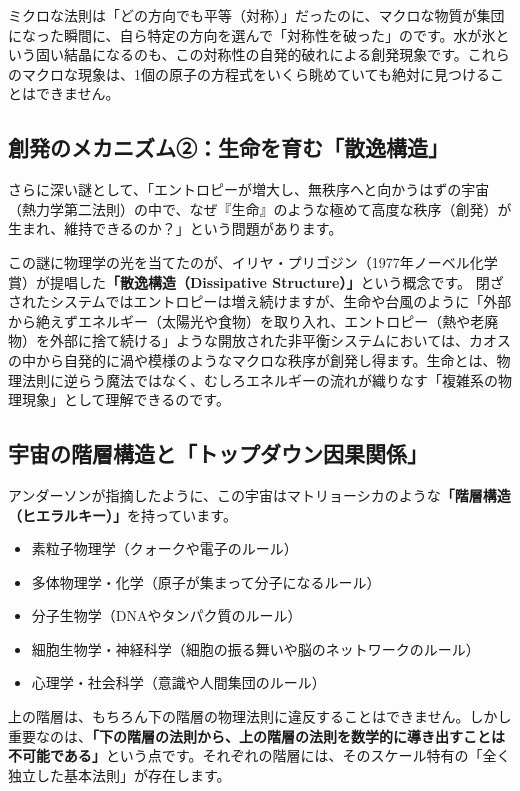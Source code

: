 ミクロな法則は「どの方向でも平等（対称）」だったのに、マクロな物質が集団になった瞬間に、自ら特定の方向を選んで「対称性を破った」のです。水が氷という固い結晶になるのも、この対称性の自発的破れによる創発現象です。これらのマクロな現象は、1個の原子の方程式をいくら眺めていても絶対に見つけることはできません。

\subsection{創発のメカニズム②：生命を育む「散逸構造」}

さらに深い謎として、「エントロピーが増大し、無秩序へと向かうはずの宇宙（熱力学第二法則）の中で、なぜ『生命』のような極めて高度な秩序（創発）が生まれ、維持できるのか？」という問題があります。

この謎に物理学の光を当てたのが、イリヤ・プリゴジン（1977年ノーベル化学賞）が提唱した\textbf{「散逸構造（Dissipative Structure）」}という概念です。 閉ざされたシステムではエントロピーは増え続けますが、生命や台風のように「外部から絶えずエネルギー（太陽光や食物）を取り入れ、エントロピー（熱や老廃物）を外部に捨て続ける」ような開放された非平衡システムにおいては、カオスの中から自発的に渦や模様のようなマクロな秩序が創発し得ます。生命とは、物理法則に逆らう魔法ではなく、むしろエネルギーの流れが織りなす「複雑系の物理現象」として理解できるのです。

\subsection{宇宙の階層構造と「トップダウン因果関係」}

アンダーソンが指摘したように、この宇宙はマトリョーシカのような\textbf{「階層構造（ヒエラルキー）」}を持っています。

\begin{itemize}
\item 素粒子物理学（クォークや電子のルール）
\item 多体物理学・化学（原子が集まって分子になるルール）
\item 分子生物学（DNAやタンパク質のルール）
\item 細胞生物学・神経科学（細胞の振る舞いや脳のネットワークのルール）
\item 心理学・社会科学（意識や人間集団のルール）
\end{itemize}

上の階層は、もちろん下の階層の物理法則に違反することはできません。しかし重要なのは、\textbf{「下の階層の法則から、上の階層の法則を数学的に導き出すことは不可能である」}という点です。それぞれの階層には、そのスケール特有の「全く独立した基本法則」が存在します。

